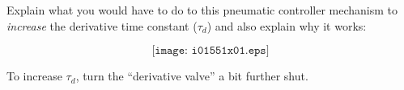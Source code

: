 

Explain what you would have to do to this pneumatic controller mechanism to {\it increase} the derivative time constant ($\tau_d$) and also explain why it works:

$$\texttt{[image: i01551x01.eps]}$$







To increase $\tau_d$, turn the ``derivative valve'' a bit further shut.












